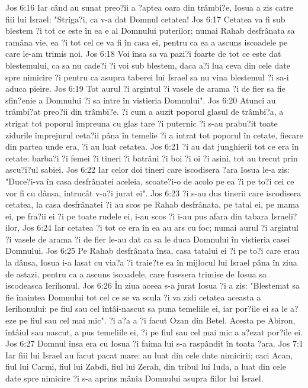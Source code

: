 Jos 6:16  Iar când au sunat preo?ii a ?aptea oara din trâmbi?e, Iosua a zis catre fiii lui Israel: "Striga?i, ca v-a dat Domnul cetatea!
Jos 6:17  Cetatea va fi sub blestem ?i tot ce este în ea e al Domnului puterilor; numai Rahab desfrânata sa ramâna vie, ea ?i tot cel ce va fi în casa ei, pentru ca ea a ascuns iscoadele pe care le-am trimis noi.
Jos 6:18  Voi însa sa va pazi?i foarte de tot ce este dat blestemului, ca sa nu cade?i ?i voi sub blestem, daca a?i lua ceva din cele date spre nimicire ?i pentru ca asupra taberei lui Israel sa nu vina blestemul ?i sa-i aduca pieire.
Jos 6:19  Tot aurul ?i argintul ?i vasele de arama ?i de fier sa fie sfin?enie a Domnului ?i sa intre în vistieria Domnului".
Jos 6:20  Atunci au trâmbi?at preo?ii din trâmbi?e. ?i cum a auzit poporul glasul de trâmbi?a, a strigat tot poporul împreuna cu glas tare ?i puternic ?i s-au prabu?it toate zidurile împrejurul ceta?ii pâna în temelie ?i a intrat tot poporul în cetate, fiecare din partea unde era, ?i au luat cetatea.
Jos 6:21  ?i au dat junghierii tot ce era în cetate: barba?i ?i femei ?i tineri ?i batrâni ?i boi ?i oi ?i asini, tot au trecut prin ascu?i?ul sabiei.
Jos 6:22  Iar celor doi tineri care iscodisera ?ara Iosua le-a zis: "Duce?i-va în casa desfrânatei aceleia, scoate?i-o de acolo pe ea ?i pe to?i cei ce vor fi cu dânsa, întrucât v-a?i jurat ei".
Jos 6:23  ?i s-au dus tinerii care iscodisera cetatea, la casa desfrânatei ?i au scos pe Rahab desfrânata, pe tatal ei, pe mama ei, pe fra?ii ei ?i pe toate rudele ei, i-au scos ?i i-au pus afara din tabara Israeli?ilor,
Jos 6:24  Iar cetatea ?i tot ce era în ea au ars cu foc; numai aurul ?i argintul ?i vasele de arama ?i de fier le-au dat ca sa le duca Domnului în vistieria casei Domnului.
Jos 6:25  Pe Rahab desfrânata însa, casa tatalui ei ?i pe to?i care erau la dânsa, Iosua i-a lasat cu via?a ?i traie?te ea în mijlocul lui Israel pâna în ziua de astazi, pentru ca a ascuns iscoadele, care fusesera trimise de Iosua sa iscodeasca Ierihonul.
Jos 6:26  În ziua aceea s-a jurat Iosua ?i a zis: "Blestemat sa fie înaintea Domnului tot cel ce se va scula ?i va zidi cetatea aceasta a Ierihonului: pe fiul sau cel întâi-nascut sa puna temeliile ei, iar por?ile ei sa le a?eze pe fiul sau cel mai mic". ?i a?a a ?i facut Ozan din Betel. Acesta pe Abiron, întâiul sau nascut, a pus temeliile ei, ?i pe fiul sau cel mai mic a a?ezat por?ile ei.
Jos 6:27  Domnul însa era cu Iosua ?i faima lui s-a raspândit în toata ?ara.
Jos 7:1  Iar fiii lui Israel au facut pacat mare: au luat din cele date nimicirii; caci Acan, fiul lui Carmi, fiul lui Zabdi, fiul lui Zerah, din tribul lui Iuda, a luat din cele date spre nimicire ?i s-a aprins mânia Domnului asupra fiilor lui Israel.
